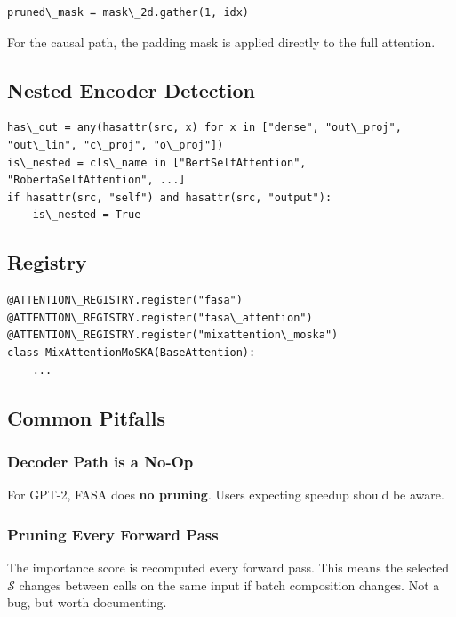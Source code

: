 \begin{lstlisting}
pruned\_mask = mask\_2d.gather(1, idx)
\end{lstlisting}

For the causal path, the padding mask is applied directly to the full 
attention.

\subsection{Nested Encoder Detection}

\begin{lstlisting}
has\_out = any(hasattr(src, x) for x in ["dense", "out\_proj", "out\_lin", "c\_proj", "o\_proj"])
is\_nested = cls\_name in ["BertSelfAttention", "RobertaSelfAttention", ...]
if hasattr(src, "self") and hasattr(src, "output"):
    is\_nested = True
\end{lstlisting}

\subsection{Registry}

\begin{lstlisting}
@ATTENTION\_REGISTRY.register("fasa")
@ATTENTION\_REGISTRY.register("fasa\_attention")
@ATTENTION\_REGISTRY.register("mixattention\_moska")
class MixAttentionMoSKA(BaseAttention):
    ...
\end{lstlisting}

\subsection{Common Pitfalls}

\subsubsection{Decoder Path is a No-Op}

For GPT-2, FASA does \textbf{no pruning}. Users expecting speedup should be 
aware.

\subsubsection{Pruning Every Forward Pass}

The importance score is recomputed every forward pass. This means the 
selected $\mathcal{S}$ changes between calls on the same input if batch 
composition changes. Not a bug, but worth documenting.

